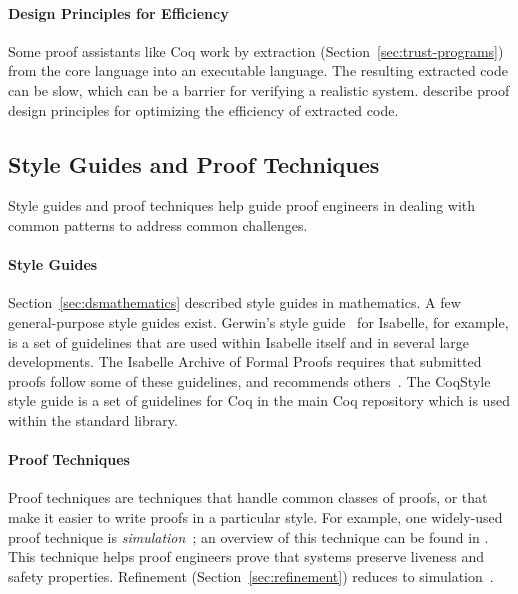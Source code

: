 \paragraph{Design Principles for Efficiency}
Some proof assistants like Coq work by extraction (Section~\ref{sec:trust-programs}) from the core language into an executable language.
The resulting extracted code can be slow, which can be a barrier for verifying a realistic system.
\citet{CruzFilipe2003, CruzFilipe2006} describe proof design principles for optimizing the efficiency of extracted
code.


\subsection{Style Guides and Proof Techniques}
\label{sec:techniques}

Style guides and proof techniques help
guide proof engineers in dealing with common patterns to address common challenges.

\paragraph{Style Guides}
Section~\ref{sec:dsmathematics} described style guides in mathematics.
A few general-purpose style guides exist.
Gerwin's style guide~\citep{isabellestyle} for Isabelle, for example,
is a set of guidelines that are used within Isabelle itself and in several
large developments. The Isabelle Archive of Formal Proofs requires that submitted proofs
follow some of these guidelines, and recommends others~\citep{isabelleafp}.
The CoqStyle~\citep{coqstyle} style guide is a set of guidelines for Coq
in the main Coq repository which is used within the standard library. %

\paragraph{Proof Techniques}
Proof techniques are techniques that handle common classes of proofs, or that make it easier
to write proofs in a particular style.
For example, one widely-used proof technique is \textit{simulation}~\citep{Lynch1994};
an overview of this technique can be found in \cite{FRAPBook}.
This technique helps proof engineers prove that systems
preserve liveness and safety properties.
Refinement (Section~\ref{sec:refinement}) reduces to simulation~\citep{Klein2014micro}.

